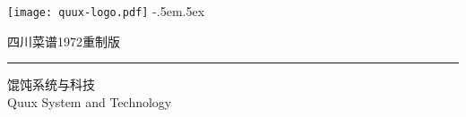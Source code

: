 
\begingroup%
\texttt{[image: quux-logo.pdf]}%
{\sffamily\tiny\kern-.5em\lower.5ex\hbox{\texttrademark}}%
\endgroup%

\vfill

\begin{flushright}
\singlespacing
\footnotesize%
\sffamily%
%
四川菜谱1972重制版%
	\mbox{\hspace{.87814pt}}%

\vspace{-.3125\baselineskip}%
\rule{73.11665pt}{1pt}%
\vspace{.1875\baselineskip}%

馄饨系统与科技%
	\mbox{\hspace{10.20990pt}}\\%
{\tiny Quux System and Technology}%
\end{flushright}

